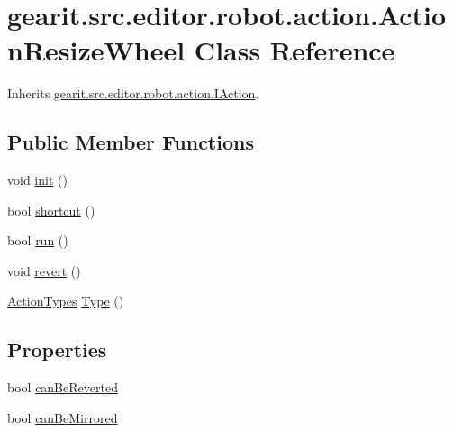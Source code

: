 \hypertarget{classgearit_1_1src_1_1editor_1_1robot_1_1action_1_1_action_resize_wheel}{\section{gearit.\+src.\+editor.\+robot.\+action.\+Action\+Resize\+Wheel Class Reference}
\label{classgearit_1_1src_1_1editor_1_1robot_1_1action_1_1_action_resize_wheel}
}


Inherits \hyperlink{interfacegearit_1_1src_1_1editor_1_1robot_1_1action_1_1_i_action}{gearit.\+src.\+editor.\+robot.\+action.\+I\+Action}.

\subsection*{Public Member Functions}
\begin{DoxyCompactItemize}
\item 
void \hyperlink{classgearit_1_1src_1_1editor_1_1robot_1_1action_1_1_action_resize_wheel_a8c26b39433b0a490ce1bc7f88a954a54}{init} ()
\item 
bool \hyperlink{classgearit_1_1src_1_1editor_1_1robot_1_1action_1_1_action_resize_wheel_a571efd81acb7ad5707d4c86c9ad09e9d}{shortcut} ()
\item 
bool \hyperlink{classgearit_1_1src_1_1editor_1_1robot_1_1action_1_1_action_resize_wheel_aad8ed7e60de8ce24499c645e6a6cfdcb}{run} ()
\item 
void \hyperlink{classgearit_1_1src_1_1editor_1_1robot_1_1action_1_1_action_resize_wheel_a675a2eedada6eb3e43a1836cde5546bf}{revert} ()
\item 
\hyperlink{namespacegearit_1_1src_1_1editor_1_1robot_1_1action_a4be0fd46e3952d6135136b20e7b3fc5e}{Action\+Types} \hyperlink{classgearit_1_1src_1_1editor_1_1robot_1_1action_1_1_action_resize_wheel_aa98679c728b9c0aabb3bec5dcdf6200a}{Type} ()
\end{DoxyCompactItemize}
\subsection*{Properties}
\begin{DoxyCompactItemize}
\item 
bool \hyperlink{classgearit_1_1src_1_1editor_1_1robot_1_1action_1_1_action_resize_wheel_a5916ffcbba1679f8ad87012cd6668757}{can\+Be\+Reverted}
\item 
bool \hyperlink{classgearit_1_1src_1_1editor_1_1robot_1_1action_1_1_action_resize_wheel_a2304d0f3f186142833a12c636947026b}{can\+Be\+Mirrored}
\end{DoxyCompactItemize}


